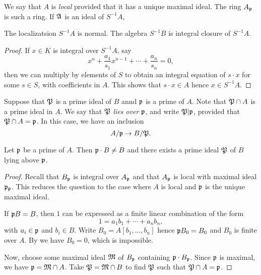 We say that $A$ is \emph{local} provided that it has a unique maximal ideal.
The ring $A_{\mathfrak{p}}$ is such a ring.
If $\mathfrak{A}$ is an ideal of $S^{-1}A$, 

\begin{proposition}
  The localizatsion $S^{-1}A$ is normal.
  The algebra $S^{-1}B$ is integral closure of $S^{-1}A$.
\end{proposition}
\begin{proof}
  If $x \in K$ is integral over $S^{-1}A$, say
  \[ x^{n} + \frac{a_{1}}{s_{1}} x^{n-1} + \cdots + \frac{a_{n}}{s_{n}} = 0, \]
  then we can multiply by elements of $S$ to obtain an integral equation of $s \cdot x$ for some $s \in S$, with coefficients in $A$.
  This shows that $s \cdot x \in A$ hence $x \in S^{-1} A$.
\end{proof}

Suppose that $\mathfrak{P}$ is a prime ideal of $B$ annd $\mathfrak{p}$ is a prime of $A$.
Note that $\mathfrak{P} \cap A$ is a prime ideal in $A$.
We say that $\mathfrak{P}$ \emph{lies over} $\mathfrak{p}$, and write $\mathfrak{P} | \mathfrak{p}$, provided that $\mathfrak{P} \cap A = \mathfrak{p}$.
In this case, we have an inclusion
\[ A/\mathfrak{p} \to B/\mathfrak{P}. \]

\begin{proposition}\label{proposition:exists_prime_above}
  Let $\mathfrak{p}$ be a prime of $A$.
  Then $\mathfrak{p} \cdot B \neq B$ and there exists a prime ideal $\mathfrak{P}$ of $B$ lying above $\mathfrak{p}$.
\end{proposition}
\begin{proof}
  Recall that $B_{\mathfrak{p}}$ is integral over $A_{\mathfrak{p}}$ and that $A_{\mathfrak{p}}$ is local with maximal ideal $\mathfrak{p}_{\mathfrak{p}}$.
  This reduces the question to the case where $A$ is local and $\mathfrak{p}$ is the unique maximal ideal.

  If $\mathfrak{p} B = B$, then $1$ can be expressed as a finite linear combination of the form
  \[ 1 = a_{1} b_{1} + \cdots + a_{n} b_{n}, \]
  with $a_{i} \in \mathfrak{p}$ and $b_{i} \in B$.
  Write $B_{0} = A[b_{1},\ldots,b_{n}]$ hence $\mathfrak{p} B_{0} = B_{0}$ and $B_{0}$ is finite over $A$.
  By  we have $B_{0} = 0$, which is impossible.

  Now, choose some maximal ideal $\mathfrak{M}$ of $B_{\mathfrak{p}}$ containing $\mathfrak{p} \cdot B_{\mathfrak{p}}$.
  Since $\mathfrak{p}$ is maximal, we have $\mathfrak{p} = \mathfrak{M} \cap A$.
  Take $\mathfrak{P} = \mathfrak{M} \cap B$ to find $\mathfrak{P}$ such that $\mathfrak{P} \cap A = \mathfrak{p}$.
\end{proof}

